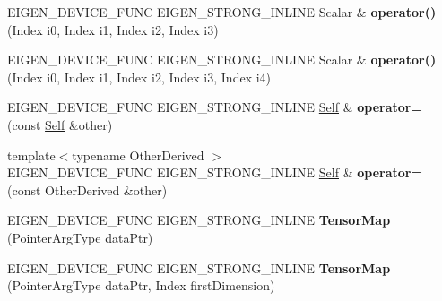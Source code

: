 \begin{DoxyCompactItemize}
\item 
\mbox{\label{class_eigen_1_1_tensor_map_ac39f341876b165a99e3add4aa67a240f}} 
E\+I\+G\+E\+N\+\_\+\+D\+E\+V\+I\+C\+E\+\_\+\+F\+U\+NC E\+I\+G\+E\+N\+\_\+\+S\+T\+R\+O\+N\+G\+\_\+\+I\+N\+L\+I\+NE Scalar \& {\bfseries operator()} (Index i0, Index i1, Index i2, Index i3)
\item 
\mbox{\label{class_eigen_1_1_tensor_map_ab4e98c03d9cf22edccc9c1644da7e186}} 
E\+I\+G\+E\+N\+\_\+\+D\+E\+V\+I\+C\+E\+\_\+\+F\+U\+NC E\+I\+G\+E\+N\+\_\+\+S\+T\+R\+O\+N\+G\+\_\+\+I\+N\+L\+I\+NE Scalar \& {\bfseries operator()} (Index i0, Index i1, Index i2, Index i3, Index i4)
\item 
\mbox{\label{class_eigen_1_1_tensor_map_a7a025b2315e0f38623686647f6776526}} 
E\+I\+G\+E\+N\+\_\+\+D\+E\+V\+I\+C\+E\+\_\+\+F\+U\+NC E\+I\+G\+E\+N\+\_\+\+S\+T\+R\+O\+N\+G\+\_\+\+I\+N\+L\+I\+NE \hyperlink{class_eigen_1_1_tensor_map}{Self} \& {\bfseries operator=} (const \hyperlink{class_eigen_1_1_tensor_map}{Self} \&other)
\item 
\mbox{\label{class_eigen_1_1_tensor_map_ac7426162ffc477e871bed521fbb5e1cc}} 
{\footnotesize template$<$typename Other\+Derived $>$ }\\E\+I\+G\+E\+N\+\_\+\+D\+E\+V\+I\+C\+E\+\_\+\+F\+U\+NC E\+I\+G\+E\+N\+\_\+\+S\+T\+R\+O\+N\+G\+\_\+\+I\+N\+L\+I\+NE \hyperlink{class_eigen_1_1_tensor_map}{Self} \& {\bfseries operator=} (const Other\+Derived \&other)
\item 
\mbox{\label{class_eigen_1_1_tensor_map_a1ff87b67a4c8bb91713005ca6081b331}} 
E\+I\+G\+E\+N\+\_\+\+D\+E\+V\+I\+C\+E\+\_\+\+F\+U\+NC E\+I\+G\+E\+N\+\_\+\+S\+T\+R\+O\+N\+G\+\_\+\+I\+N\+L\+I\+NE {\bfseries Tensor\+Map} (Pointer\+Arg\+Type data\+Ptr)
\item 
\mbox{\label{class_eigen_1_1_tensor_map_ada30a3291f1111741e7aeda07e0d8a70}} 
E\+I\+G\+E\+N\+\_\+\+D\+E\+V\+I\+C\+E\+\_\+\+F\+U\+NC E\+I\+G\+E\+N\+\_\+\+S\+T\+R\+O\+N\+G\+\_\+\+I\+N\+L\+I\+NE {\bfseries Tensor\+Map} (Pointer\+Arg\+Type data\+Ptr, Index first\+Dimension)
\item 
\mbox{\label{class_eigen_1_1_tensor_map_a8e09bf0ceb0091cbbd2eafd242f12b98}} 

\end{DoxyCompactItemize}
